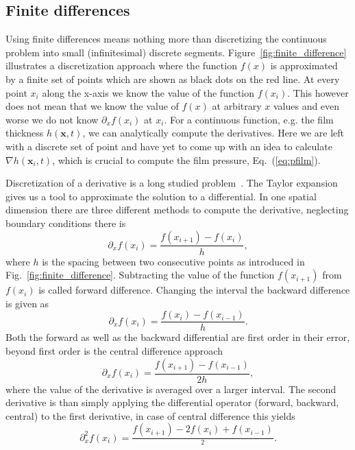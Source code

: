 \subsection{Finite differences}
Using finite differences means nothing more than discretizing the continuous problem into small (infinitesimal) discrete segments.
Figure~\ref{fig:finite_difference} illustrates a discretization approach where the function $f(x)$ is approximated by a finite set of points which are shown as black dots on the red line.
At every point $x_i$ along the x-axis we know the value of the function $f(x_i)$.
This however does not mean that we know the value of $f(x)$ at arbitrary $x$ values and even worse we do not know $\partial_x f(x_i)$ at $x_i$. 
For a continuous function, e.g. the film thickness $h(\mathbf{x},t)$, we can analytically compute the derivatives. 
Here we are left with a discrete set of point and have yet to come up with an idea to calculate $\nabla h(\mathbf{x}_i, t)$, which is crucial to compute the film pressure, Eq.~(\ref{eq:pfilm}).

Discretization of a derivative is a long studied problem~\cite{booleTreatiseCalculusFinite1872, jordanCalculusFiniteDifferences1965}.
The Taylor expansion gives us a tool to approximate the solution to a differential.
In one spatial dimension there are three different methods to compute the derivative, neglecting boundary conditions there is
\begin{equation}\label{eq:forward_dif}
    \partial_x f(x_i) = \frac{f(x_{i+1}) - f(x_i)}{h},
\end{equation}
where $h$ is the spacing between two consecutive points as introduced in Fig.~\ref{fig:finite_difference}. 
Subtracting the value of the function $f(x_{i+1})$ from $f(x_i)$ is called forward difference.
Changing the interval the backward difference is given as
\begin{equation}\label{eq:backward_dif}
    \partial_x f(x_i) = \frac{f(x_i) - f(x_{i-1})}{h}.
\end{equation}
Both the forward as well as the backward differential are first order in their error, beyond first order is the central difference approach
\begin{equation}\label{eq:center_diff}
    \partial_x f(x_i) = \frac{f(x_{i+1}) - f(x_{i-1})}{2h},
\end{equation}
where the value of the derivative is averaged over a larger interval. 
The second derivative is than simply applying the differential operator (forward, backward, central) to  the first derivative, in case of central difference this yields
\begin{equation}\label{eq:second_central_diff}
    \partial_x^2 f(x_i) = \frac{f(x_{i+1})-2f(x_i)+f(x_{i-1})}{^2}.
\end{equation}

